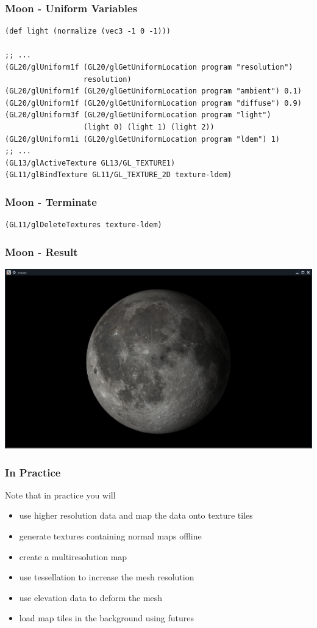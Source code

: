 \documentclass[aspectratio=169,11pt,xcolor=dvipsnames]{beamer}
\begin{document}
\begin{frame}[fragile]
  \frametitle{Moon {-} Uniform Variables}
  \begin{verbatim}
(def light (normalize (vec3 -1 0 -1)))

;; ...
(GL20/glUniform1f (GL20/glGetUniformLocation program "resolution")
                  resolution)
(GL20/glUniform1f (GL20/glGetUniformLocation program "ambient") 0.1)
(GL20/glUniform1f (GL20/glGetUniformLocation program "diffuse") 0.9)
(GL20/glUniform3f (GL20/glGetUniformLocation program "light")
                  (light 0) (light 1) (light 2))
(GL20/glUniform1i (GL20/glGetUniformLocation program "ldem") 1)
;; ...
(GL13/glActiveTexture GL13/GL_TEXTURE1)
(GL11/glBindTexture GL11/GL_TEXTURE_2D texture-ldem)
  \end{verbatim}
\end{frame}

\begin{frame}[fragile]
  \frametitle{Moon {-} Terminate}
  \begin{verbatim}
(GL11/glDeleteTextures texture-ldem)
  \end{verbatim}
\end{frame}

\begin{frame}
  \frametitle{Moon {-} Result}
  \begin{center}
    \includegraphics[width=.8\textwidth]{moon}
  \end{center}
\end{frame}

\begin{frame}
  \frametitle{In Practice}
  Note that in practice you will
  \begin{itemize}
    \item use higher resolution data and map the data onto texture tiles
    \item generate textures containing normal maps offline
    \item create a multiresolution map
    \item use tessellation to increase the mesh resolution
    \item use elevation data to deform the mesh
    \item load map tiles in the background using futures
  \end{itemize}
\end{frame}
\end{document}
